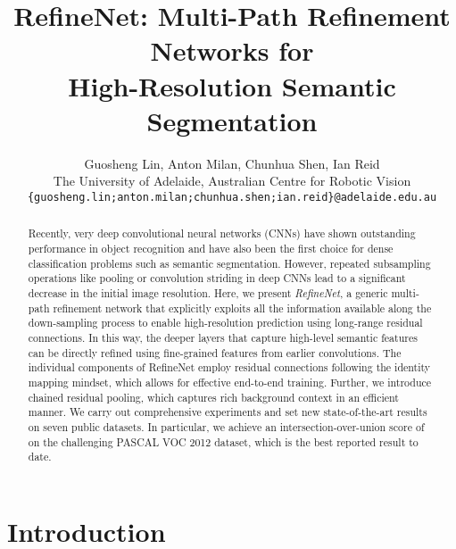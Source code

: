 \documentclass[10pt,twocolumn,letterpaper]{article}
\begin{document}
\title{RefineNet: Multi-Path Refinement Networks for\\ High-Resolution Semantic Segmentation}


\author{Guosheng Lin, \; Anton Milan, \; Chunhua Shen, \; Ian Reid\\
The University of Adelaide, \; Australian Centre for Robotic Vision\\
{\tt\small \{guosheng.lin;anton.milan;chunhua.shen;ian.reid\}@adelaide.edu.au}
}


\maketitle



\begin{abstract}

Recently, very deep convolutional neural networks (CNNs) have shown outstanding performance in object recognition and have also been the first choice for dense classification problems such as semantic segmentation. However, repeated subsampling operations like pooling or convolution striding in deep CNNs lead to a significant decrease in the initial image resolution.  
Here, we present \emph{RefineNet}, a generic multi-path refinement network that explicitly exploits all the information available along the down-sampling process to enable high-resolution prediction using long-range residual connections. In this way, the deeper layers that capture high-level semantic features can be directly refined using fine-grained features from earlier convolutions. The individual components of RefineNet employ residual connections following the identity mapping mindset, which allows for effective end-to-end training. Further, we introduce chained residual pooling, which captures rich background context in an efficient manner. We carry out comprehensive experiments and set new state-of-the-art results on seven public datasets. In particular, we achieve an intersection-over-union score of  on the challenging PASCAL VOC 2012 dataset, which is the best reported result to date.



 \end{abstract}


\section{Introduction}
\label{sec:introduction}
\end{document}
